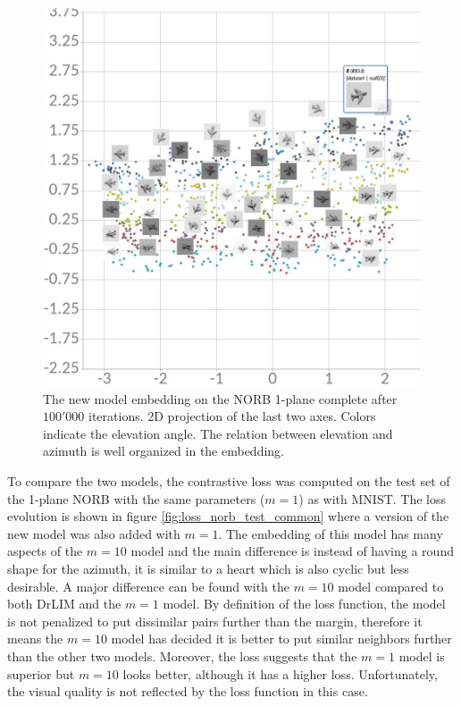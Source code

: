 \documentclass[a4paper,12pt]{report}
\begin{document}
\begin{figure}
    \centering
    \includegraphics[width=\textwidth]{thesis_figures/norb_cl2d2.jpg}
    \caption{The new model embedding on the NORB 1-plane complete after $100'000$ iterations.
    2D projection of the last two axes.
    Colors indicate the elevation angle.
    The relation between elevation and azimuth is well organized in the embedding.
    }
    \label{fig:norb_cl2d_embedding_2}
\end{figure}

To compare the two models, the contrastive loss was computed on the test set of the 1-plane NORB with the same parameters ($m=1$) as with MNIST.
The loss evolution is shown in figure \ref{fig:loss_norb_test_common} where a version of the new model was also added with $m=1$.
The embedding of this model has many aspects of the $m=10$ model and the main difference is instead of having a round shape for the azimuth, it is similar to a heart which is also cyclic but less desirable.
A major difference can be found with the $m=10$  model compared to both DrLIM and the $m=1$ model.
By definition of the loss function, the model is not penalized to put dissimilar pairs further than the margin, therefore it means the $m=10$ model has decided it is better to put similar neighbors further than the other two models.
Moreover, the loss suggests that the $m=1$ model is superior but $m=10$ looks better, although it has a higher loss.
Unfortunately, the visual quality is not reflected by the loss function in this case.
\end{document}

